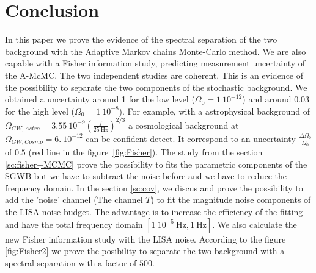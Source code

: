 \documentclass[a4paper,12pt]{article}
\begin{document}
\section{Conclusion}
In this paper we prove the evidence of the spectral separation of the two background with the Adaptive Markov chains Monte-Carlo method. We are also capable with a Fisher information study, predicting measurement uncertainty of the A-McMC. The two independent studies are coherent. This is an evidence of the possibility to separate the two components of the stochastic background. We obtained a uncertainty around 1 for the low level ($\Omega_0 = 1 \ 10^{-12}$) and around 0.03 for the high level ($\Omega_0 = 1 \ 10^{-8}$).
For example, with a astrophysical background of $\Omega_{GW,Astro} = 3.55 \ 10^{-9} \left(\frac{f}{25 \ \text{Hz}}\right)^{2/3}$ a cosmological background at $\Omega_{GW,Cosmo} = 6. \ 10^{-12}$ can be confident detect. It correspond to an uncertainty $\frac{\Delta \Omega_0 }{\Omega_0}$ of $0.5$ (red line in the figure~\ref{fig:Fisher}). The study from the section \ref{sc:fisher+MCMC} prove the possibility to fits the parametric components of the SGWB but we have to subtract the noise before and we have to reduce the frequency domain. In the section \ref{sc:cov}, we discus and prove the possibility to add the 'noise' channel (The channel $T$) to fit the magnitude noise components of the LISA noise budget. The advantage is to increase the efficiency of the fitting and have the total frequency domain $[1 \ 10^{-5} \ \text{Hz}, 1 \ \text{Hz}]$. We also calculate the new Fisher information study with the LISA noise. According to the figure \ref{fig:Fisher2} we prove the posibility to separate the two background with a spectral separation with a factor of $500$.       


\end{document}
